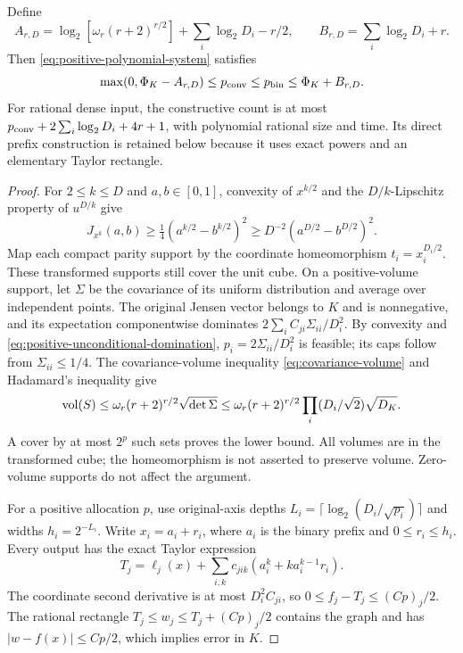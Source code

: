 \begin{proposition}\label{prop:positive-baseline}
Define
\[
 A_{r,D}=\log_2[\omega_r(r+2)^{r/2}]+\sum_i\log_2D_i-r/2,
 \qquad B_{r,D}=\sum_i\log_2D_i+r.
\]
Then \eqref{eq:positive-polynomial-system} satisfies
\begin{equation}\label{eq:positive-baseline-law}
 \max(0,\Phi_K-A_{r,D})\le p_{\mathrm{conv}}\le p_{\mathrm{bin}}
 \le\Phi_K+B_{r,D}.
\end{equation}
For rational dense input, the constructive count is at most
$p_{\mathrm{conv}}+2\sum_i\log_2D_i+4r+1$, with polynomial rational size and
time. Its direct prefix construction is retained below because it
uses exact powers and an elementary Taylor rectangle.
\end{proposition}
\begin{proof}
For $2\le k\le D$ and $a,b\in[0,1]$, convexity of $x^{k/2}$ and
the $D/k$-Lipschitz property of $u^{D/k}$ give
\[
 J_{x^k}(a,b)\ge\tfrac14(a^{k/2}-b^{k/2})^2
 \ge D^{-2}(a^{D/2}-b^{D/2})^2.
\]
Map each compact parity support by the coordinate homeomorphism
$t_i=x_i^{D_i/2}$. These transformed supports still cover the unit
cube. On a positive-volume support, let $\Sigma$ be the covariance
of its uniform distribution and average over independent points.
The original Jensen vector belongs to $K$ and is nonnegative, and
its expectation componentwise dominates
$2\sum_iC_{ji}\Sigma_{ii}/D_i^2$. By convexity and
\eqref{eq:positive-unconditional-domination}, $p_i=2\Sigma_{ii}/D_i^2$ is
feasible; its caps follow from $\Sigma_{ii}\le1/4$.
The covariance-volume inequality \eqref{eq:covariance-volume} and
Hadamard's inequality give
\[
 \operatorname{vol}(S)\le\omega_r(r+2)^{r/2}\sqrt{\det\Sigma}
 \le\omega_r(r+2)^{r/2}\prod_i(D_i/\sqrt2)\sqrt{D_K}.
\]
A cover by at most $2^p$ such sets proves the lower bound. All volumes
are in the transformed cube; the homeomorphism is not asserted to
preserve volume. Zero-volume supports do not affect the argument.

For a positive allocation $p$, use original-axis depths
$L_i=\lceil\log_2(D_i/\sqrt{p_i})\rceil$ and widths
$h_i=2^{-L_i}$. Write $x_i=a_i+r_i$, where $a_i$ is the binary
prefix and $0\le r_i\le h_i$. Every output has the exact Taylor
expression
\[
 T_j=\ell_j(x)+\sum_{i,k}c_{jik}
                 (a_i^k+k a_i^{k-1}r_i).
\]
The coordinate second derivative is at most $D_i^2C_{ji}$, so
$0\le f_j-T_j\le(Cp)_j/2$. The rational rectangle
$T_j\le w_j\le T_j+(Cp)_j/2$ contains the graph and has
$|w-f(x)|\le Cp/2$, which implies error in $K$.


\end{proof}
